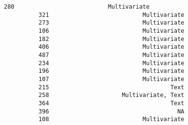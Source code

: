 \documentclass[11pt]{article}
\begin{document}
\begin{Verbatim}[commandchars=\\\{\}]
          280                           Multivariate   
          321                           Multivariate   
          273                           Multivariate   
          106                           Multivariate   
          182                           Multivariate   
          406                           Multivariate   
          487                           Multivariate   
          234                           Multivariate   
          196                           Multivariate   
          107                           Multivariate   
          215                                   Text   
          258                     Multivariate, Text   
          364                                   Text   
          396                                     NA   
          108                           Multivariate   
          

\end{Verbatim}
\end{document}
